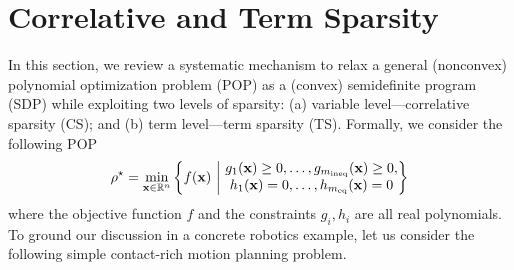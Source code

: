 
\section{Correlative and Term Sparsity}
\label{sec:general-sparsity-ksc}

In this section, we review a systematic mechanism to relax a  general (nonconvex) polynomial optimization problem (POP) as a (convex) semidefinite program (SDP) while exploiting two levels of sparsity: (a) variable level---correlative sparsity (CS); and (b) term level---term sparsity (TS). 
Formally, we consider the following POP
\begin{align}
    \label{eq:gs:general-pop}
    \rho^\star = \min_{\mathbf{x}\in \mathbb{R}^n}\left\{
        f(\mathbf{x})\ \middle\vert\   \substack{ \displaystyle g_1(\mathbf{x})\ge 0, \dots, g_{m_{\text{ineq}}}(\mathbf{x})\ge 0,\\
        \displaystyle h_1(\mathbf{x}) = 0, \dots, h_{m_{\text{eq}}}(\mathbf{x}) = 0}
    \right\} 
\end{align}
where the objective function $f$ and the constraints $g_i, h_i$ are all real polynomials. To ground our discussion in a concrete robotics example, let us consider the following simple contact-rich motion planning problem.


